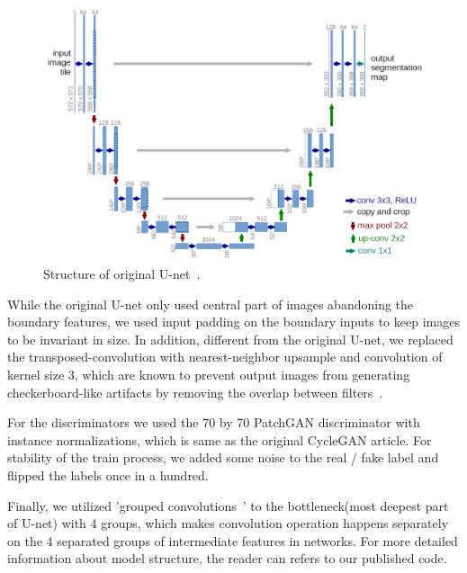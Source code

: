 \begin{figure}[ht]
    \begin{center}
    \includegraphics[scale=0.2]{Graphics/u-net-architecture.png}
    \end{center}
    \caption{Structure of original U-net~\cite{unet}.}\label{FIG:unet}
\end{figure}

While the original U-net only used central part of images abandoning the boundary features, we used input padding on the boundary inputs to keep images to be invariant in size. In addition, different from the original U-net, we replaced the transposed-convolution with nearest-neighbor upsample and convolution of kernel size 3, which are known to prevent output images from generating checkerboard-like artifacts by removing the overlap between filters~\cite{odena2016deconvolution}.

For the discriminators we used the 70 by 70 PatchGAN discriminator with instance normalizations, which is same as the original CycleGAN article. For stability of the train process, we added some noise to the real / fake label and flipped the labels once in a hundred.

Finally, we utilized 'grouped convolutions~\cite{Grouped}' to the bottleneck(most deepest part of U-net) with 4 groups, which makes convolution operation happens separately on the 4 separated groups of intermediate features in networks. For more detailed information about model structure, the reader can refers to our published code.

\endinput

